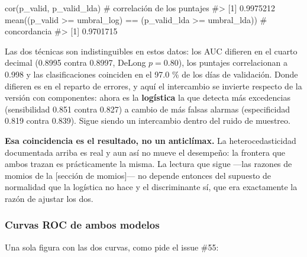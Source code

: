 \documentclass[
  spanish,
  letterpaper,
  DIV=11,
  numbers=noendperiod]{scrartcl}
\newenvironment{Shaded}{\begin{snugshade}}{\end{snugshade}}
\newcommand{\CommentTok}[1]{\textcolor[rgb]{0.37,0.37,0.37}{#1}}
\newcommand{\FunctionTok}[1]{\textcolor[rgb]{0.28,0.35,0.67}{#1}}
\newcommand{\NormalTok}[1]{\textcolor[rgb]{0.00,0.23,0.31}{#1}}
\newcommand{\SpecialCharTok}[1]{\textcolor[rgb]{0.37,0.37,0.37}{#1}}
\begin{document}
\begin{Shaded}
\begin{Highlighting}[]
\FunctionTok{cor}\NormalTok{(p\_valid, p\_valid\_lda) }\CommentTok{\# correlación de los puntajes}
\CommentTok{\#\textgreater{} [1] 0.9975212}
\FunctionTok{mean}\NormalTok{((p\_valid }\SpecialCharTok{\textgreater{}=}\NormalTok{ umbral\_log) }\SpecialCharTok{==}\NormalTok{ (p\_valid\_lda }\SpecialCharTok{\textgreater{}=}\NormalTok{ umbral\_lda)) }\CommentTok{\# concordancia}
\CommentTok{\#\textgreater{} [1] 0.9701715}
\end{Highlighting}
\end{Shaded}

Las dos técnicas son indistinguibles en estos datos: los AUC difieren en
el cuarto decimal (0.8995 contra 0.8997, DeLong \(p = 0.80\)), los
puntajes correlacionan a 0.998 y las clasificaciones coinciden en el
97.0 \% de los días de validación. Donde difieren es en el reparto de
errores, y aquí el intercambio se invierte respecto de la versión con
componentes: ahora es la \textbf{logística} la que detecta más
excedencias (sensibilidad 0.851 contra 0.827) a cambio de más falsas
alarmas (especificidad 0.819 contra 0.839). Sigue siendo un intercambio
dentro del ruido de muestreo.

\textbf{Esa coincidencia es el resultado, no un anticlímax.} La
heterocedasticidad documentada arriba es real y aun así no mueve el
desempeño: la frontera que ambos trazan es prácticamente la misma. La
lectura que sigue ---las razones de momios de la {[}sección de
momios{]}--- no depende entonces del supuesto de normalidad que la
logística no hace y el discriminante sí, que era exactamente la razón de
ajustar los dos.

\subsubsection{Curvas ROC de ambos
modelos}\label{curvas-roc-de-ambos-modelos}

Una sola figura con las dos curvas, como pide el issue \#55:
\end{document}
